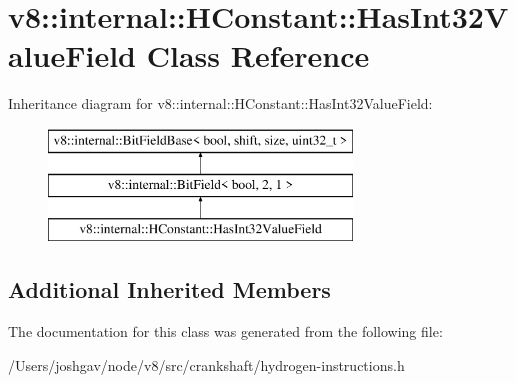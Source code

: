\hypertarget{classv8_1_1internal_1_1_h_constant_1_1_has_int32_value_field}{}\section{v8\+:\+:internal\+:\+:H\+Constant\+:\+:Has\+Int32\+Value\+Field Class Reference}
\label{classv8_1_1internal_1_1_h_constant_1_1_has_int32_value_field}
Inheritance diagram for v8\+:\+:internal\+:\+:H\+Constant\+:\+:Has\+Int32\+Value\+Field\+:\begin{figure}[H]
\begin{center}
\leavevmode
\includegraphics[height=3.000000cm]{classv8_1_1internal_1_1_h_constant_1_1_has_int32_value_field}
\end{center}
\end{figure}
\subsection*{Additional Inherited Members}


The documentation for this class was generated from the following file\+:\begin{DoxyCompactItemize}
\item 
/\+Users/joshgav/node/v8/src/crankshaft/hydrogen-\/instructions.\+h\end{DoxyCompactItemize}
